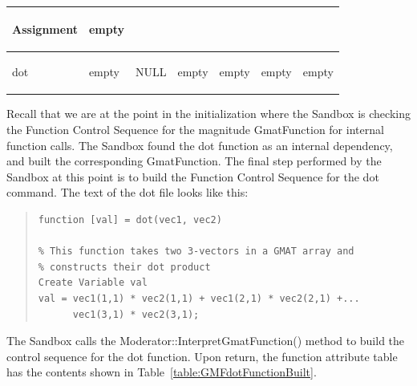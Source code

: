 \begin{center}
\begin{supertabular}{|p{0.9in}|p{0.65in}|p{0.62in}|p{0.83in}|p{0.75in}|p{0.8in}|p{0.7in}|}
\begin{small}
Assignment 
\end{small} & \begin{small}empty\end{small}\\
\hline
\begin{small}dot\end{small} & \begin{small}empty\end{small} &
\begin{small}NULL\end{small} & \begin{small}empty\end{small} &
\begin{small}empty\end{small} & \begin{small}empty\end{small} &
\begin{small}empty\end{small}\\
\hline
\end{supertabular}
\end{center}

Recall that we are at the point in the initialization where the Sandbox is checking the Function
Control Sequence for the magnitude GmatFunction for internal function calls.  The Sandbox found the
dot function as an internal dependency, and built the corresponding GmatFunction.  The final step
performed by the Sandbox at this point is to build the Function Control Sequence for the dot
command.  The text of the dot file looks like this:

\begin{quote}
\begin{verbatim}
function [val] = dot(vec1, vec2)

% This function takes two 3-vectors in a GMAT array and
% constructs their dot product
Create Variable val
val = vec1(1,1) * vec2(1,1) + vec1(2,1) * vec2(2,1) +...
      vec1(3,1) * vec2(3,1);
\end{verbatim} 
\end{quote}

The Sandbox calls the Moderator::InterpretGmatFunction() method to build the control sequence for
the dot function.  Upon return, the function attribute table has the contents shown in
Table~\ref{table:GMFdotFunctionBuilt}.

